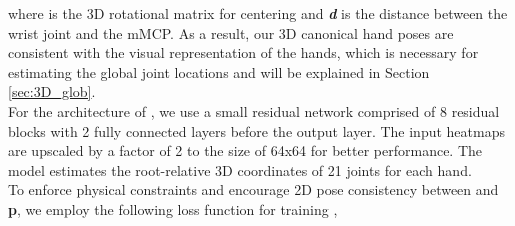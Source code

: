 \documentclass[10pt,twocolumn,letterpaper]{article}
\begin{document}
where  is the 3D rotational matrix for centering  and \textbf{\textit{d}} is the distance between the wrist joint and the mMCP. As a result, our 3D canonical hand poses are consistent with the visual representation of the hands, which is necessary for estimating the global joint locations and will be explained in Section \ref{sec:3D_glob}.\\
\indent For the architecture of \textit{}, we use a small residual network comprised of 8 residual blocks with 2 fully connected layers before the output layer. The input heatmaps are upscaled by a factor of 2 to the size of 64x64 for better performance. The model estimates the root-relative 3D coordinates of 21 joints for each hand.\\
\indent To enforce physical constraints and encourage 2D pose consistency between  and \textbf{p}, we employ the following loss function for training \textit{}, \\
\end{document}
